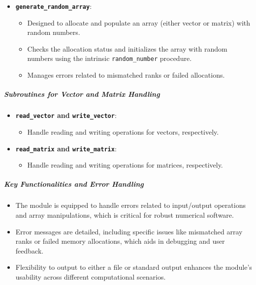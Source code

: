 \begin{enumerate}
\begin{itemize}
\item \textbf{\texttt{generate\_random\_array}}:

\begin{itemize}
\item Designed to allocate and populate an array (either vector or matrix) with random numbers.
\item Checks the allocation status and initializes the array with random numbers using the intrinsic \texttt{random\_number} procedure.
\item Manages errors related to mismatched ranks or failed allocations.
\end{itemize}
\end{itemize}
\end{enumerate}

\subparagraph{Subroutines for Vector and Matrix Handling}

\begin{itemize}
\item \textbf{\texttt{read\_vector} and \texttt{write\_vector}}:

\begin{itemize}
\item Handle reading and writing operations for vectors, respectively.
\end{itemize}


\item \textbf{\texttt{read\_matrix} and \texttt{write\_matrix}}:

\begin{itemize}
\item Handle reading and writing operations for matrices, respectively.
\end{itemize}
\end{itemize}

\subparagraph{Key Functionalities and Error Handling}

\begin{itemize}
\item The module is equipped to handle errors related to input/output operations and array manipulations, which is critical for robust numerical software.
\item Error messages are detailed, including specific issues like mismatched array ranks or failed memory allocations, which aids in debugging and user feedback.
\item Flexibility to output to either a file or standard output enhances the module's usability across different computational scenarios.
\end{itemize}

